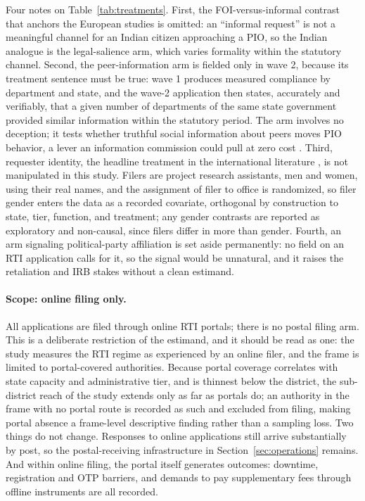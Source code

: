 \documentclass[11pt]{article}
\begin{document}
Four notes on Table~\ref{tab:treatments}. First, the FOI-versus-informal contrast that anchors the European studies \citep{worthy2017, grimmelikhuijsen2019} is omitted: an ``informal request'' is not a meaningful channel for an Indian citizen approaching a PIO, so the Indian analogue is the legal-salience arm, which varies formality within the statutory channel. Second, the peer-information arm is fielded only in wave 2, because its treatment sentence must be true: wave 1 produces measured compliance by department and state, and the wave-2 application then states, accurately and verifiably, that a given number of departments of the same state government provided similar information within the statutory period. The arm involves no deception; it tests whether truthful social information about peers moves PIO behavior, a lever an information commission could pull at zero cost \citep{benaaron2017}. Third, requester identity, the headline treatment in the international literature \citep{osji2006, michener2020, pineiro2018}, is not manipulated in this study. Filers are project research assistants, men and women, using their real names, and the assignment of filer to office is randomized, so filer gender enters the data as a recorded covariate, orthogonal by construction to state, tier, function, and treatment; any gender contrasts are reported as exploratory and non-causal, since filers differ in more than gender. Fourth, an arm signaling political-party affiliation is set aside permanently: no field on an RTI application calls for it, so the signal would be unnatural, and it raises the retaliation and IRB stakes without a clean estimand.

\paragraph{Scope: online filing only.} All applications are filed through online RTI portals; there is no postal filing arm. This is a deliberate restriction of the estimand, and it should be read as one: the study measures the RTI regime as experienced by an online filer, and the frame is limited to portal-covered authorities. Because portal coverage correlates with state capacity and administrative tier, and is thinnest below the district, the sub-district reach of the study extends only as far as portals do; an authority in the frame with no portal route is recorded as such and excluded from filing, making portal absence a frame-level descriptive finding rather than a sampling loss. Two things do not change. Responses to online applications still arrive substantially by post, so the postal-receiving infrastructure in Section~\ref{sec:operations} remains. And within online filing, the portal itself generates outcomes: downtime, registration and OTP barriers, and demands to pay supplementary fees through offline instruments are all recorded.
\end{document}
